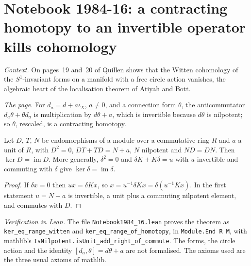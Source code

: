 \section[Notebook 1984-16: a homotopy to an invertible operator]{Notebook 1984-16: a contracting homotopy to an invertible operator kills cohomology\protect{}}\label{sec:quillen-1984-16}

\emph{Context.} On pages~19 and~20 of  Quillen shows that the Witten cohomology of the $S^1$-invariant forms on a manifold with a free circle action vanishes, the algebraic heart of the localisation theorem of Atiyah and Bott.

\emph{The page.} For $d_a = d + a\iota_X$, $a \ne 0$, and a connection form $\theta$, the anticommutator $d_a\theta + \theta d_a$ is multiplication by $d\theta + a$, which is invertible because $d\theta$ is nilpotent; so $\theta$, rescaled, is a contracting homotopy.

\begin{encadre}
\begin{theoreme}\label{thm:quillen-1984-16}
Let $D$, $T$, $N$ be endomorphisms of a module over a commutative ring $R$ and $a$ a unit of $R$, with $D^2 = 0$, $DT + TD = N + a$, $N$ nilpotent and $ND = DN$. Then $\ker D = \operatorname{im} D$. More generally, $\delta^2 = 0$ and $\delta K + K\delta = u$ with $u$ invertible and commuting with $\delta$ give $\ker\delta = \operatorname{im}\delta$.
\end{theoreme}
\end{encadre}

\begin{proof}
If $\delta x = 0$ then $ux = \delta Kx$, so $x = u^{-1}\delta Kx = \delta(u^{-1}Kx)$. In the first statement $u = N + a$ is invertible, a unit plus a commuting nilpotent element, and commutes with $D$.
\end{proof}

\emph{Verification in Lean.} The file \href{\leanblobmain/Notebook1984_16.lean}{\texttt{Notebook1984\_16.\allowbreak{}lean}} proves the theorem as \texttt{ker\_eq\_range\_witten} and \texttt{ker\_eq\_range\_of\_homotopy}, in \texttt{Module.End R M}, with mathlib's \texttt{IsNilpotent.isUnit\_add\_right\_of\_commute}. The forms, the circle action and the identity $[d_a, \theta] = d\theta + a$ are not formalised. The axioms used are the three usual axioms of mathlib.

